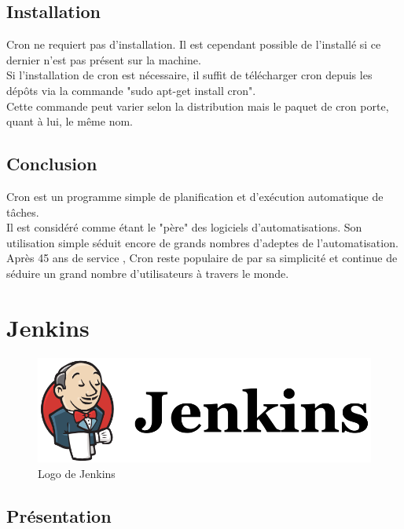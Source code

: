 \documentclass[12pt]{article}
\begin{document}
\subsection{Installation}
Cron ne requiert pas d'installation. Il est cependant possible de l'installé si ce dernier n'est pas présent sur la machine. 
\\
Si l'installation de cron est nécessaire, il suffit de télécharger cron depuis les dépôts via la commande "sudo apt-get install cron".
\\
Cette commande peut varier selon la distribution mais le paquet de cron porte, quant à lui, le même nom.

\subsection{Conclusion}
Cron est un programme simple de planification et d'exécution automatique de tâches. 
\\
Il est considéré comme étant le "père" des logiciels d'automatisations. Son utilisation simple séduit encore de grands nombres d'adeptes de l'automatisation.
\\
Après 45 ans de service , Cron reste populaire de par sa simplicité et continue de séduire un grand nombre d'utilisateurs à travers le monde.

\section{Jenkins}

\begin{figure}[ht]
    \includegraphics[scale=0.5]{images/jenkins.png}
    \caption{Logo de Jenkins}
\end{figure}

\subsection{Présentation}
\end{document}
